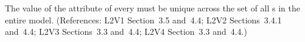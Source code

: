 The value of the  attribute of every \UnitDefinition must be
unique across the set of all \UnitDefinition{}s in the entire
model.  (References: L2V1 Section~3.5 and~4.4; L2V2 Sections~3.4.1 and~4.4;
L2V3 Sections~3.3 and~4.4; L2V4 Section~3.3 and~4.4.)
